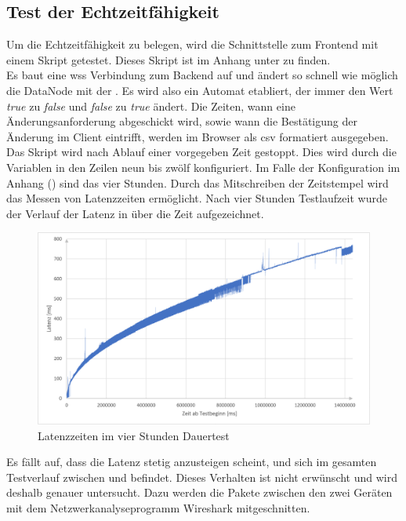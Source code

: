 \subsection{Test der Echtzeitfähigkeit}
Um die Echtzeitfähigkeit zu belegen, wird die Schnittstelle zum Frontend mit einem Skript getestet.
Dieses Skript ist im Anhang unter  zu finden. 
\\Es baut eine \ac{wss} Verbindung zum Backend auf und ändert so schnell wie möglich die DataNode mit der .
Es wird also ein Automat etabliert, der immer den Wert \emph{true} zu \emph{false} und \emph{false} zu \emph{true} ändert.
Die Zeiten, wann eine Änderungsanforderung abgeschickt wird, sowie wann die Bestätigung der Änderung im Client eintrifft, 
werden im Browser als \ac{csv} formatiert ausgegeben. Das Skript wird nach Ablauf einer vorgegeben Zeit gestoppt. 
Dies wird durch die Variablen in den Zeilen neun bis zwölf konfiguriert. 
Im Falle der Konfiguration im Anhang () sind das vier Stunden.
Durch das Mitschreiben der Zeitstempel wird das Messen von Latenzzeiten ermöglicht.
Nach vier Stunden Testlaufzeit wurde der Verlauf der Latenz in  über die Zeit aufgezeichnet.
\begin{figure}[ht]
  \centering
  \includegraphics[width=\textwidth]{content/hauptteil/umsetzungPoC/pocTest/res/LatenzNormal4h.pdf}
  \caption{Latenzzeiten im vier Stunden Dauertest}
  \label{fig:testing:latency4hNorm}
\end{figure}
Es fällt auf, dass die Latenz stetig anzusteigen scheint, und sich im gesamten Testverlauf zwischen  und  befindet.
Dieses Verhalten ist nicht erwünscht und wird deshalb genauer untersucht.
Dazu werden die Pakete zwischen den zwei Geräten mit dem Netzwerkanalyseprogramm Wireshark \citep{wireshark:program} mitgeschnitten.
